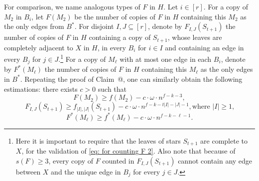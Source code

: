 \documentclass[10pt]{article}
\makeatletter
\newcommand*{\rom}[1]{\expandafter\@slowromancap\romannumeral #1@}
\makeatother
\begin{document}
For comparison, we name analogous types of $F$ in $H$.
Let $i\in [r]$. For a copy of $M_2$ in $B_i$, let $F(M_2)$ be the number of copies of $F$ in $H$ containing this $M_2$ as the only edges from $B^\ast$.
For disjoint $I, J\subseteq [r]$, denote by $F_{I,J}(S_{t+1})$ the number of copies of $F$ in $H$ containing a copy of $S_{t+1}$,
whose leaves are completely adjacent to $X$ in $H$, in every $B_{i}$ for $i\in I$ and containing an edge in every $B_{j}$ for $j\in J$.\footnote{Here it is important to require that the leaves of stars $S_{t+1}$ are complete to $X$, for the validation of \eqref{eq: for counting F 2}. Also note that because of $s(F)\geq 3$, every copy of $F$ counted in $F_{I,J}(S_{t+1})$ cannot contain any edge between $X$ and the unique edge in $B_{j}$ for every $j\in J$.}
For a copy of $M_\ell$ with at most one edge in each $B_i$, denote by $F^\ast(M_\ell)$ the number of copies of $F$ in $H$ containing this $M_\ell$ as the only edges in $B^\ast$.
Repeating the proof of Claim~\rom{3}, one can similarly obtain the following estimations: there exists $c>0$ such that
\begin{equation}\label{eq: for counting F 1}
  F(M_2)\geq f(M_2) - c\cdot \omega\cdot n^{f-k-3},
\end{equation}
\begin{equation}\label{eq: for counting F 2}
F_{I,J}(S_{t+1})\geq  f_{|I|,|J|}(S_{t+1})- c\cdot \omega\cdot n^{f-k-t|I|-|J|-1}, \mbox{where $|I|\geq 1$,}
\end{equation}
\begin{equation}\label{eq: for counting F 3}
F^\ast(M_\ell)\geq f^\ast(M_\ell) - c\cdot \omega\cdot n^{f-k-\ell-1}.
\end{equation}
\end{document}
